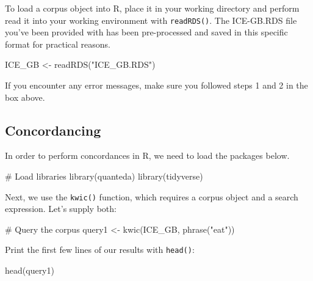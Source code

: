 \documentclass[
  11pt,
  letterpaper,
  DIV=11,
  numbers=noendperiod]{scrreprt}
\newenvironment{Shaded}{\begin{snugshade}}{\end{snugshade}}
\newcommand{\CommentTok}[1]{\textcolor[rgb]{0.37,0.37,0.37}{#1}}
\newcommand{\FunctionTok}[1]{\textcolor[rgb]{0.28,0.35,0.67}{#1}}
\newcommand{\NormalTok}[1]{\textcolor[rgb]{0.00,0.23,0.31}{#1}}
\newcommand{\OtherTok}[1]{\textcolor[rgb]{0.00,0.23,0.31}{#1}}
\newcommand{\StringTok}[1]{\textcolor[rgb]{0.13,0.47,0.30}{#1}}
\begin{document}
To load a corpus object into R, place it in your working directory and
perform read it into your working environment with \texttt{readRDS()}.
The ICE-GB.RDS file you've been provided with has been pre-processed and
saved in this specific format for practical reasons.

\begin{Shaded}
\begin{Highlighting}[]
\NormalTok{ICE\_GB }\OtherTok{\textless{}{-}} \FunctionTok{readRDS}\NormalTok{(}\StringTok{"ICE\_GB.RDS"}\NormalTok{)}
\end{Highlighting}
\end{Shaded}

If you encounter any error messages, make sure you followed steps 1 and
2 in the box above.

\subsection{Concordancing}\label{concordancing-1}

In order to perform concordances in R, we need to load the packages
below.

\begin{Shaded}
\begin{Highlighting}[]
\CommentTok{\# Load libraries}
\FunctionTok{library}\NormalTok{(quanteda)}
\FunctionTok{library}\NormalTok{(tidyverse)}
\end{Highlighting}
\end{Shaded}

Next, we use the \texttt{kwic()} function, which requires a corpus
object and a search expression. Let's supply both:

\begin{Shaded}
\begin{Highlighting}[]
\CommentTok{\# Query the corpus}
\NormalTok{query1 }\OtherTok{\textless{}{-}} \FunctionTok{kwic}\NormalTok{(ICE\_GB, }\FunctionTok{phrase}\NormalTok{(}\StringTok{"eat"}\NormalTok{))}
\end{Highlighting}
\end{Shaded}

Print the first few lines of our results with \texttt{head()}:

\begin{Shaded}
\begin{Highlighting}[]
\FunctionTok{head}\NormalTok{(query1)}
\end{Highlighting}
\end{Shaded}
\end{document}
